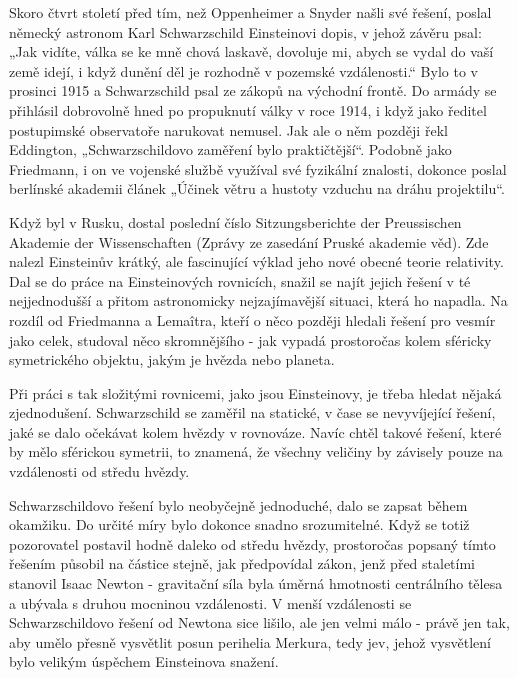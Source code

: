   Skoro čtvrt století před tím, než Oppenheimer a Snyder našli své řešení, poslal německý astronom
  Karl Schwarzschild Einsteinovi dopis, v jehož závěru psal: „Jak vidíte, válka se ke mně chová
  laskavě, dovoluje mi, abych se vydal do vaší země idejí, i když dunění děl je rozhodně v pozemské
  vzdálenosti.“ Bylo to v prosinci 1915 a Schwarzschild psal ze zákopů na východní frontě. Do armády
  se přihlásil dobrovolně hned po propuknutí války v roce 1914, i když jako ředitel postupimské
  observatoře narukovat nemusel. Jak ale o něm později řekl Eddington, „Schwarzschildovo zaměření
  bylo praktičtější“. Podobně jako Friedmann, i on ve vojenské službě využíval své fyzikální
  znalosti, dokonce poslal berlínské akademii článek „Účinek větru a hustoty vzduchu na dráhu
  projektilu“. 
  
  Když byl v Rusku, dostal poslední číslo Sitzungsberichte der Preussischen Akademie der
  Wissenschaften (Zprávy ze zasedání Pruské akademie věd). Zde nalezl Einsteinův krátký, ale
  fascinující výklad jeho nové obecné teorie relativity. Dal se do práce na Einsteinových rovnicích,
  snažil se najít jejich řešení v té nejjednodušší a přitom astronomicky nejzajímavější situaci,
  která ho napadla. Na rozdíl od Friedmanna a Lemaîtra, kteří o něco později hledali řešení pro
  vesmír jako celek, studoval něco skromnějšího - jak vypadá prostoročas kolem sféricky symetrického
  objektu, jakým je hvězda nebo planeta. 
  
  Při práci s tak složitými rovnicemi, jako jsou Einsteinovy, je třeba hledat nějaká zjednodušení.
  Schwarzschild se zaměřil na statické, v čase se nevyvíjející řešení, jaké se dalo očekávat kolem
  hvězdy v rovnováze. Navíc chtěl takové řešení, které by mělo sférickou symetrii, to znamená, že
  všechny veličiny by závisely pouze na vzdálenosti od středu hvězdy. 
  
  Schwarzschildovo řešení bylo neobyčejně jednoduché, dalo se zapsat během okamžiku. Do určité míry
  bylo dokonce snadno srozumitelné. Když se totiž pozorovatel postavil hodně daleko od středu
  hvězdy, prostoročas popsaný tímto řešením působil na částice stejně, jak předpovídal zákon, jenž
  před staletími stanovil Isaac Newton - gravitační síla byla úměrná hmotnosti centrálního tělesa a
  ubývala s druhou mocninou vzdálenosti. V menší vzdálenosti se Schwarzschildovo řešení od Newtona
  sice lišilo, ale jen velmi málo - právě jen tak, aby umělo přesně vysvětlit posun perihelia
  Merkura, tedy jev, jehož vysvětlení bylo velikým úspěchem Einsteinova snažení. 
  
